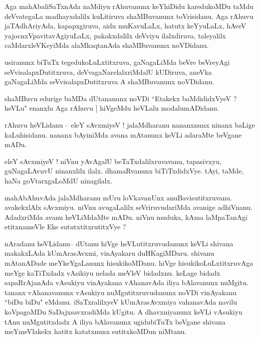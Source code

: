 \documentclass{article}
\begin{document}
\begin{mn}%
Aga mahAbaliSaTxnAda naMdiyu rAhuvanunx keYhiDidu karedukoMDu taMdu deVvategaLa 
madhayxdalilx kuLitiruva shaMBuvanunx toVrisidanu. Aga rAhuvu jaTAdhAriyAda, kapapxgiruva, 
aidu muKavuLaLx, hatutx keYyuLaLx, hAveV yajocnxVpavitavAgiyuLaLx, pakakxdalilx deVviyu 
ilalxdiruva, taleyalilx caMdarxleVKeyiMda alaMkaqtanAda shaMBuvanunx noVDidanu. 
\end{mn}

\begin{mn}%
usiranunx biTuTx tegedukoLuLxtitxruva, gaNagaLiMda beVre beVreyAgi seVvisalapxDutitxruva, 
deVvagaNarelalxriMdalU kUDiruva, aneVka gaNagaLiMda seVvisalapxDutitxruva A shaMBuvanunx 
noVDidanu.
\end{mn}

\begin{mn}%
shaMBuvu edurige baMDa dUtananunx noVDi ``Etakekx baMdididxVyeV ? heVLu" enanxlu Aga rAhuvu ]
hiVgeMdu heVLalu modalumADidanu.
\end{mn}

\begin{mn}%
rAhuvu heVLidanu -- eleY sAvxmiyeV ! jalaMdharanu nananxnunx ninanx baLige kaLuhisidanu. 
nananx bAyiniMda avana mAtanunx keVLi adaraMte beVgane mADu.
\end{mn}

\begin{mn}%
eleY sAvxmiyeV ! niVnu yAvAgalU beTaTxdalilxruvavanu, tapasivxyu, guNagaLAvuvU ninanxlilx 
ilalx. dhamaRvanunx biTiTxdidxVye. tAyi, taMde, haNa goVtarxgaLoMdU ninagilalx.
\end{mn}

\begin{mn}%
mahAbAhuvAda jalaMdharanu mUru loVkavanUnx anuBavisutitxruvanu. avakekxlAlx sAvxmiyu. niVnu 
avugaLalilx seVriruvudariMda avanige adhiVnanu. AdadxriMda avanu heVLiMdaMte mADu. niVnu 
muduka, kAma laMpaTanAgi etitxnameVle Eke sututxtitxrutitxVye ?
\end{mn}

\begin{mn}%
nAradanu heVLidanu-- dUtanu hiVge heVLutitxruvudanunx keVLi shivana makakxLAda kUmArasAvxmi, 
vinAyakaru duHKagiMDaru. shivanu mAtanADade meYkeYgaLanunx hisukikoMDanu. hiVge 
hisukikoLuLxtitxruvAga meYge kaTiTxdadx vAsikiyu nelada meVleV bidadxnu. keLage bidadx 
sapaRrAjanAda vAsukiyu vinAyakana vAhanavAda iliya bAlavanunx nuMgitu. tananx vAhanavanunx 
vAsukiyu nuMgutitxruvudanunx noVDi vinAyakanu ``biDu biDu" eMdanu. iSaTxralilxyeV 
kUmArasAvxmiya vahanavAda navilu koVpagoMDu SaDajxsavxradiMda kUgitu. A dhavxniyanunx keVLi 
vAsukiyu tAnu nuMgutitxdadx A iliya bAlavanunx ugidubiTuTx beVgane shivana meYmeVlakekx 
hatitx katatxnunx sutitxkoMDun niMtanu.
\end{mn}
\end{document}
